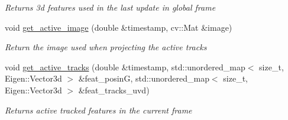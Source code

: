 \begin{DoxyCompactItemize}
\begin{DoxyCompactList}\small\item\em Returns 3d features used in the last update in global frame \end{DoxyCompactList}\item 
\mbox{\label{classov__msckf_1_1VioManager_a6f73eaacca9a468e02d6322e0987c480}} 
void \hyperlink{classov__msckf_1_1VioManager_a6f73eaacca9a468e02d6322e0987c480}{get\+\_\+active\+\_\+image} (double \&timestamp, cv\+::\+Mat \&image)
\begin{DoxyCompactList}\small\item\em Return the image used when projecting the active tracks \end{DoxyCompactList}\item 
\mbox{\label{classov__msckf_1_1VioManager_a2645f06f1516cec870e6d69f2baa66ba}} 
void \hyperlink{classov__msckf_1_1VioManager_a2645f06f1516cec870e6d69f2baa66ba}{get\+\_\+active\+\_\+tracks} (double \&timestamp, std\+::unordered\+\_\+map$<$ size\+\_\+t, Eigen\+::\+Vector3d $>$ \&feat\+\_\+posinG, std\+::unordered\+\_\+map$<$ size\+\_\+t, Eigen\+::\+Vector3d $>$ \&feat\+\_\+tracks\+\_\+uvd)
\begin{DoxyCompactList}\small\item\em Returns active tracked features in the current frame \end{DoxyCompactList}\end{DoxyCompactItemize}
